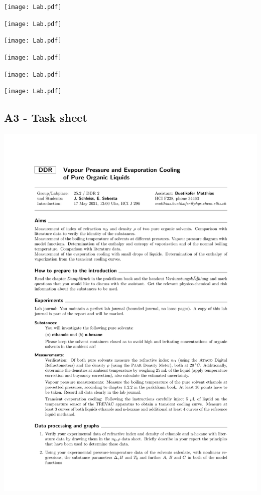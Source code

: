 \documentclass[a4paper,abstracton]{article}	                       %
\begin{document}
\texttt{[image: Lab.pdf]}

\texttt{[image: Lab.pdf]}

\texttt{[image: Lab.pdf]}

\texttt{[image: Lab.pdf]}

\texttt{[image: Lab.pdf]}

\texttt{[image: Lab.pdf]}

\subsection*{A3 - Task sheet}
\includegraphics[page = 1,width=\textwidth]{DDRtask.pdf}
\end{document}
